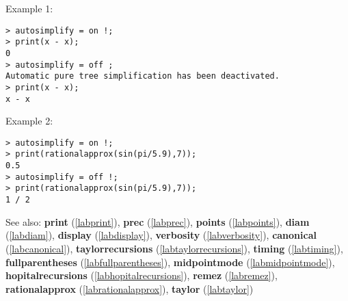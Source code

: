 \noindent Example 1: 
\begin{center}\begin{minipage}{15cm}\begin{Verbatim}[frame=single]
> autosimplify = on !;
> print(x - x);
0
> autosimplify = off ;
Automatic pure tree simplification has been deactivated.
> print(x - x);
x - x
\end{Verbatim}
\end{minipage}\end{center}
\noindent Example 2: 
\begin{center}\begin{minipage}{15cm}\begin{Verbatim}[frame=single]
> autosimplify = on !; 
> print(rationalapprox(sin(pi/5.9),7));
0.5
> autosimplify = off !; 
> print(rationalapprox(sin(pi/5.9),7));
1 / 2
\end{Verbatim}
\end{minipage}\end{center}
See also: \textbf{print} (\ref{labprint}), \textbf{prec} (\ref{labprec}), \textbf{points} (\ref{labpoints}), \textbf{diam} (\ref{labdiam}), \textbf{display} (\ref{labdisplay}), \textbf{verbosity} (\ref{labverbosity}), \textbf{canonical} (\ref{labcanonical}), \textbf{taylorrecursions} (\ref{labtaylorrecursions}), \textbf{timing} (\ref{labtiming}), \textbf{fullparentheses} (\ref{labfullparentheses}), \textbf{midpointmode} (\ref{labmidpointmode}), \textbf{hopitalrecursions} (\ref{labhopitalrecursions}), \textbf{remez} (\ref{labremez}), \textbf{rationalapprox} (\ref{labrationalapprox}), \textbf{taylor} (\ref{labtaylor})
